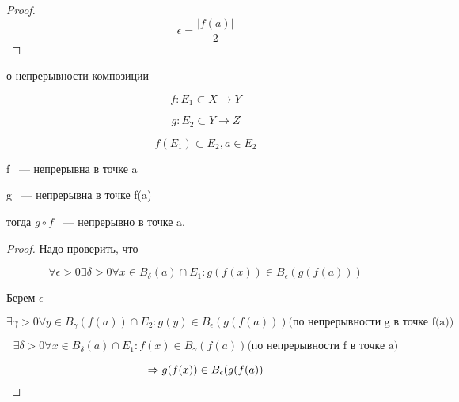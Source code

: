  
\begin{proof}
$$\epsilon = \frac{|f(a)|}{2}$$
\end{proof}

\begin{theorem}{о непрерывности композиции}

$$f: E_1 \subset X \to Y$$

$$g:E_2 \subset Y \to Z$$

$$f(E_1) \subset E_2, a \in E_2$$

f ~--- непрерывна в точке a

g ~---  непрерывна в точке f(a)

тогда $g \circ f$ ~--- непрерывно в точке a.

\end{theorem}
\begin{proof}
Надо проверить, что 

$$\forall \epsilon > 0 \exists \delta > 0 \forall x \in B_{\delta}(a) \cap E_1: g(f(x)) \in B_{\epsilon}(g(f(a))) $$

Берем $\epsilon$

$$\exists \gamma > 0 \forall y \in B_{\gamma}(f(a)) \cap E_2: g(y) \in B_{\epsilon}(g(f(a))) \text{(по непрерывности g в точке f(a))}$$

$$\exists \delta > 0 \forall x \in B_{\delta}(a) \cap E_1: f(x) \in B_{\gamma}(f(a)) \text{(по непрерывности f в точке a)}$$

$$\Rightarrow g(f(x)) \in B_{\epsilon}(g(f(a))$$

\end{proof}
